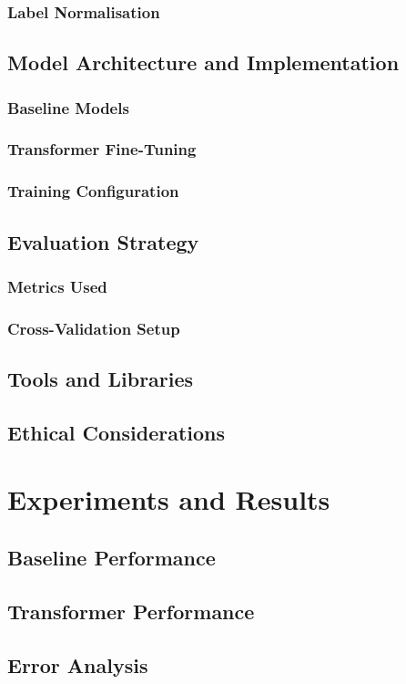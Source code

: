 \documentclass[12pt]{report}
\begin{document}
\subsection{Label Normalisation}
\section{Model Architecture and Implementation}
\subsection{Baseline Models}
\subsection{Transformer Fine-Tuning}
\subsection{Training Configuration}
\section{Evaluation Strategy}
\subsection{Metrics Used}
\subsection{Cross-Validation Setup}
\section{Tools and Libraries}
\section{Ethical Considerations}

\chapter{Experiments and Results}
\section{Baseline Performance}
\section{Transformer Performance}
\section{Error Analysis}
\end{document}
